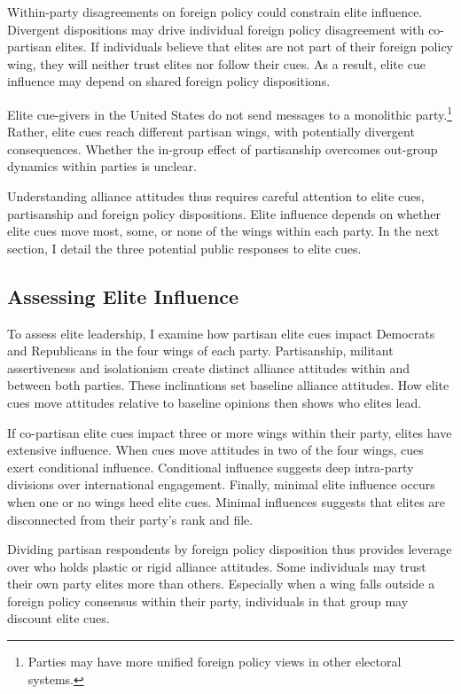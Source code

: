 \documentclass[12pt]{article}
\begin{document}
Within-party disagreements on foreign policy could constrain elite influence. 
Divergent dispositions may drive individual foreign policy disagreement with co-partisan elites.
If individuals believe that elites are not part of their foreign policy wing, they will neither trust elites nor follow their cues. 
As a result, elite cue influence may depend on shared foreign policy dispositions.


Elite cue-givers in the United States do not send messages to a monolithic party.\footnote{Parties may have more unified foreign policy views in other electoral systems.}
Rather, elite cues reach different partisan wings, with potentially divergent consequences. 
Whether the in-group effect of partisanship overcomes out-group dynamics within parties is unclear. 


Understanding alliance attitudes thus requires careful attention to elite cues, partisanship and foreign policy dispositions. 
Elite influence depends on whether elite cues move most, some, or none of the wings within each party. 
In the next section, I detail the three potential public responses to elite cues. 




\subsection{Assessing Elite Influence}


To assess elite leadership, I examine how partisan elite cues impact Democrats and Republicans in the four wings of each party.
Partisanship, militant assertiveness and isolationism create distinct alliance attitudes within and between both parties. 
These inclinations set baseline alliance attitudes. 
How elite cues move attitudes relative to baseline opinions then shows who elites lead. 


If co-partisan elite cues impact three or more wings within their party, elites have extensive influence. 
When cues move attitudes in two of the four wings, cues exert conditional influence. 
Conditional influence suggests deep intra-party divisions over international engagement. 
Finally, minimal elite influence occurs when one or no wings heed elite cues.
Minimal influences suggests that elites are disconnected from their party's rank and file.


Dividing partisan respondents by foreign policy disposition thus provides leverage over who holds plastic or rigid alliance attitudes. 
Some individuals may trust their own party elites more than others. 
Especially when a wing falls outside a foreign policy consensus within their party, individuals in that group may discount elite cues.
\end{document}
